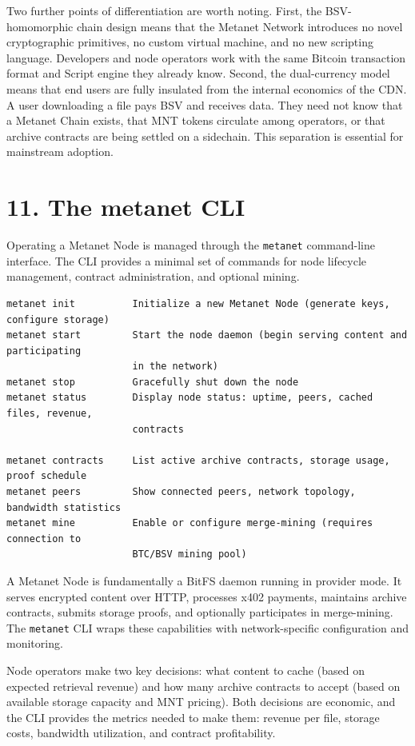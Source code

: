 \documentclass[11pt,a4paper]{article}
\begin{document}
Two further points of differentiation are worth noting. First, the BSV-homomorphic chain design means that the Metanet Network introduces no novel cryptographic primitives, no custom virtual machine, and no new scripting language. Developers and node operators work with the same Bitcoin transaction format and Script engine they already know. Second, the dual-currency model means that end users are fully insulated from the internal economics of the CDN. A user downloading a file pays BSV and receives data. They need not know that a Metanet Chain exists, that MNT tokens circulate among operators, or that archive contracts are being settled on a sidechain. This separation is essential for mainstream adoption.

\section{11. The metanet CLI}

Operating a Metanet Node is managed through the \texttt{metanet} command-line interface. The CLI provides a minimal set of commands for node lifecycle management, contract administration, and optional mining.

\begin{lstlisting}
metanet init          Initialize a new Metanet Node (generate keys, configure storage)
metanet start         Start the node daemon (begin serving content and participating
                      in the network)
metanet stop          Gracefully shut down the node
metanet status        Display node status: uptime, peers, cached files, revenue,
                      contracts

metanet contracts     List active archive contracts, storage usage, proof schedule
metanet peers         Show connected peers, network topology, bandwidth statistics
metanet mine          Enable or configure merge-mining (requires connection to
                      BTC/BSV mining pool)
\end{lstlisting}

A Metanet Node is fundamentally a BitFS daemon running in provider mode. It serves encrypted content over HTTP, processes x402 payments, maintains archive contracts, submits storage proofs, and optionally participates in merge-mining. The \texttt{metanet} CLI wraps these capabilities with network-specific configuration and monitoring.

Node operators make two key decisions: what content to cache (based on expected retrieval revenue) and how many archive contracts to accept (based on available storage capacity and MNT pricing). Both decisions are economic, and the CLI provides the metrics needed to make them: revenue per file, storage costs, bandwidth utilization, and contract profitability.
\end{document}
